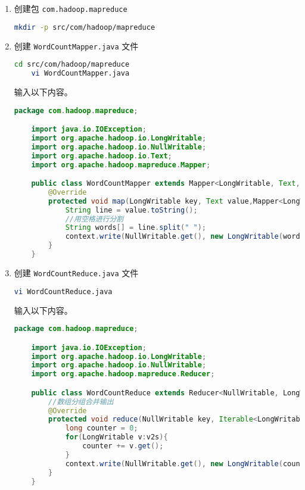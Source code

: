 \documentclass{article}
\newenvironment{enum}{
    \begin{enumerate}[label=(\arabic*), noitemsep]
}{
    \end{enumerate}
}
\begin{document}
\begin{enum}
\item 创建包 \texttt{com.hadoop.mapreduce}

\begin{lstlisting}[language=bash]
    mkdir -p src/com/hadoop/mapreduce
\end{lstlisting}

\item 创建 \texttt{WordCountMapper.java} 文件

\begin{lstlisting}[language=bash]
    cd src/com/hadoop/mapreduce
    vi WordCountMapper.java
\end{lstlisting}

输入以下内容。

\begin{lstlisting}[language=java]
    package com.hadoop.mapreduce;

    import java.io.IOException;
    import org.apache.hadoop.io.LongWritable;
    import org.apache.hadoop.io.NullWritable;
    import org.apache.hadoop.io.Text;
    import org.apache.hadoop.mapreduce.Mapper;

    public class WordCountMapper extends Mapper<LongWritable, Text, NullWritable, LongWritable> {
        @Override
        protected void map(LongWritable key, Text value,Mapper<LongWritable, Text, NullWritable, LongWritable>.Context context) throws IOException, InterruptedException {
            String line = value.toString();
            //用空格进行分割
            String words[] = line.split(" ");
            context.write(NullWritable.get(), new LongWritable(words.length));
        }
    }
\end{lstlisting}

\item 创建 \texttt{WordCountReduce.java} 文件

\begin{lstlisting}[language=bash]
    vi WordCountReduce.java
\end{lstlisting}

输入以下内容。

\begin{lstlisting}[language=java]
    package com.hadoop.mapreduce;

    import java.io.IOException;
    import org.apache.hadoop.io.LongWritable;
    import org.apache.hadoop.io.NullWritable;
    import org.apache.hadoop.mapreduce.Reducer;

    public class WordCountReduce extends Reducer<NullWritable, LongWritable, NullWritable, LongWritable> {
        //数组分组合并输出
        @Override
        protected void reduce(NullWritable key, Iterable<LongWritable> v2s, Reducer<NullWritable, LongWritable, NullWritable, LongWritable>.Context context) throws IOException, InterruptedException {
            long counter = 0;
            for(LongWritable v:v2s){
                counter += v.get();
            }
            context.write(NullWritable.get(), new LongWritable(counter));
        }
    }
\end{lstlisting}


\end{enum}
\end{document}
